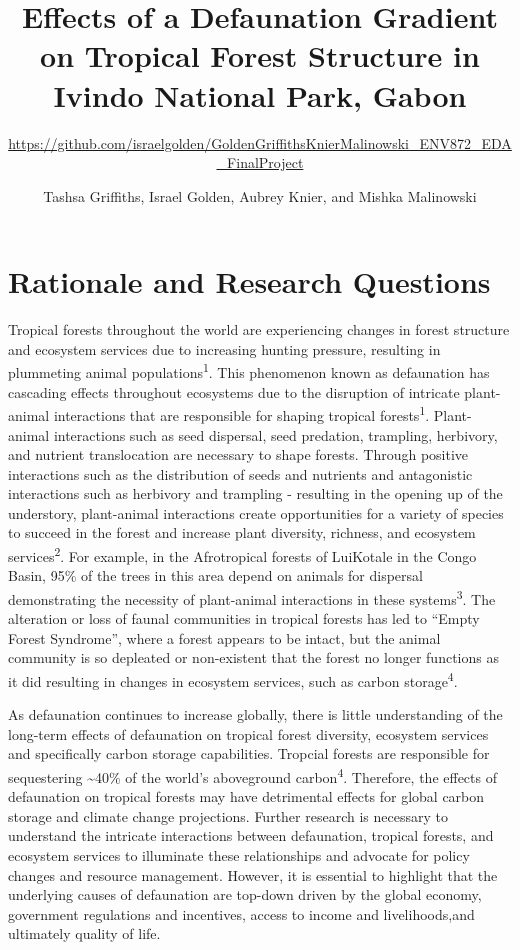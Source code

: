 \documentclass[
  12pt,
]{article}
\title{Effects of a Defaunation Gradient on Tropical Forest Structure in Ivindo
National Park, Gabon}
\subtitle{\url{https://github.com/israelgolden/GoldenGriffithsKnierMalinowski_ENV872_EDA_FinalProject}}
\author{Tashsa Griffiths, Israel Golden, Aubrey Knier, and Mishka Malinowski}
\date{}
\begin{document}
\maketitle

\newpage
\tableofcontents 
\newpage
\listoftables 
\newpage
\listoffigures 
\newpage

\hypertarget{rationale-and-research-questions}{%
\section{\texorpdfstring{\textbf{Rationale and Research
Questions}}{Rationale and Research Questions}}\label{rationale-and-research-questions}}

Tropical forests throughout the world are experiencing changes in forest
structure and ecosystem services due to increasing hunting pressure,
resulting in plummeting animal populations\textsuperscript{1}. This
phenomenon known as defaunation has cascading effects throughout
ecosystems due to the disruption of intricate plant-animal interactions
that are responsible for shaping tropical forests\textsuperscript{1}.
Plant-animal interactions such as seed dispersal, seed predation,
trampling, herbivory, and nutrient translocation are necessary to shape
forests. Through positive interactions such as the distribution of seeds
and nutrients and antagonistic interactions such as herbivory and
trampling - resulting in the opening up of the understory, plant-animal
interactions create opportunities for a variety of species to succeed in
the forest and increase plant diversity, richness, and ecosystem
services\textsuperscript{2}. For example, in the Afrotropical forests of
LuiKotale in the Congo Basin, 95\% of the trees in this area depend on
animals for dispersal demonstrating the necessity of plant-animal
interactions in these systems\textsuperscript{3}. The alteration or loss
of faunal communities in tropical forests has led to ``Empty Forest
Syndrome'', where a forest appears to be intact, but the animal
community is so depleated or non-existent that the forest no longer
functions as it did resulting in changes in ecosystem services, such as
carbon storage\textsuperscript{4}.

As defaunation continues to increase globally, there is little
understanding of the long-term effects of defaunation on tropical forest
diversity, ecosystem services and specifically carbon storage
capabilities. Tropcial forests are responsible for sequestering
\textasciitilde40\% of the world's aboveground
carbon\textsuperscript{4}. Therefore, the effects of defaunation on
tropical forests may have detrimental effects for global carbon storage
and climate change projections. Further research is necessary to
understand the intricate interactions between defaunation, tropical
forests, and ecosystem services to illuminate these relationships and
advocate for policy changes and resource management. However, it is
essential to highlight that the underlying causes of defaunation are
top-down driven by the global economy, government regulations and
incentives, access to income and livelihoods,and ultimately quality of
life.
\end{document}

